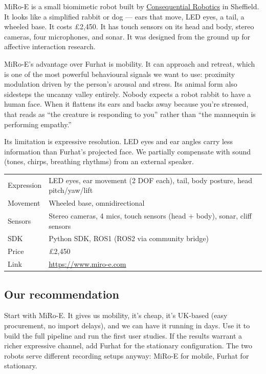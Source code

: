 \documentclass[11pt,a4paper]{article}
\begin{document}
MiRo-E is a small biomimetic robot built by \href{https://www.miro-e.com}{Consequential Robotics} in Sheffield. It looks like a simplified rabbit or dog --- ears that move, LED eyes, a tail, a wheeled base. It costs \pounds 2,450. It has touch sensors on its head and body, stereo cameras, four microphones, and sonar. It was designed from the ground up for affective interaction research.

MiRo-E's advantage over Furhat is mobility. It can approach and retreat, which is one of the most powerful behavioural signals we want to use: proximity modulation driven by the person's arousal and stress. Its animal form also sidesteps the uncanny valley entirely. Nobody expects a robot rabbit to have a human face. When it flattens its ears and backs away because you're stressed, that reads as ``the creature is responding to you'' rather than ``the mannequin is performing empathy.''

Its limitation is expressive resolution. LED eyes and ear angles carry less information than Furhat's projected face. We partially compensate with sound (tones, chirps, breathing rhythms) from an external speaker.

\begin{table}[H]
\centering\small
\begin{tabularx}{\textwidth}{lX}
\toprule
Expression & LED eyes, ear movement (2 DOF each), tail, body posture, head pitch/yaw/lift \\
Movement & Wheeled base, omnidirectional \\
Sensors & Stereo cameras, 4 mics, touch sensors (head + body), sonar, cliff sensors \\
SDK & Python SDK, ROS1 (ROS2 via community bridge) \\
Price & \pounds 2,450 \\
Link & \url{https://www.miro-e.com} \\
\bottomrule
\end{tabularx}
\end{table}

\subsection{Our recommendation}

Start with MiRo-E. It gives us mobility, it's cheap, it's UK-based (easy procurement, no import delays), and we can have it running in days. Use it to build the full pipeline and run the first user studies. If the results warrant a richer expressive channel, add Furhat for the stationary configuration. The two robots serve different recording setups anyway: MiRo-E for mobile, Furhat for stationary.
\end{document}
